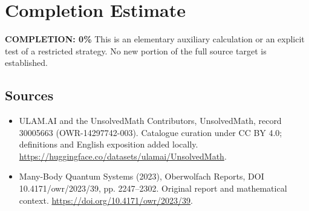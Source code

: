 \documentclass[11pt]{article}
\begin{document}
\section{Completion Estimate}
\noindent\textbf{COMPLETION: 0\%}
This is an elementary auxiliary calculation or an explicit test of a restricted strategy. No new portion of the full source target is established.

\subsection{Sources}
\begin{itemize}
\item[\hypertarget{source:30005663:1}{S1}] ULAM.AI and the UnsolvedMath Contributors, UnsolvedMath, record 30005663 (OWR-14297742-003). Catalogue curation under CC BY 4.0; definitions and English exposition added locally.
\url{https://huggingface.co/datasets/ulamai/UnsolvedMath}.
\item[\hypertarget{source:30005663:2}{S2}] Many-Body Quantum Systems (2023), Oberwolfach Reports, DOI 10.4171/owr/2023/39, pp. 2247--2302. Original report and mathematical context.
\url{https://doi.org/10.4171/owr/2023/39}.
\end{itemize}
\label{end:30005663}
\end{document}
